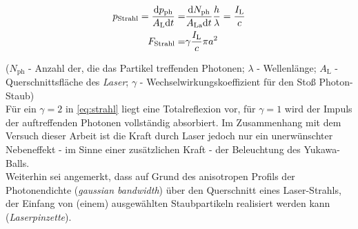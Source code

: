\documentclass[numbers=noenddot,a4paper,notitlepage,twoside,BCOR15mm]{scrbook}
\newcommand{\diff}{\textnormal{d}}
\newcommand{\ix}[1]{_\text{#1}}
\newcommand{\tilt}[1]{\textit{#1}}
\begin{document}
				\begin{align}
					p\ix{Strahl}=\frac{\diff p\ix{ph}}{A\ix{L}\diff t}=&\frac{\diff N\ix{ph}}{A\ix{La}\diff t}\frac{h}{\lambda}=\frac{I\ix{L}}{c} \nonumber \\
					F\ix{Strahl}=&\gamma\frac{I\ix{L}}{c}\pi a^2 \label{eq:strahl}
				\end{align}

			($N\ix{ph}$ - Anzahl der, die das Partikel treffenden Photonen; $\lambda$ - Wellenlänge; $A\ix{L}$ - Querschnittsfläche des \tilt{Laser}; $\gamma$ - Wechselwirkungskoeffizient für den Stoß Photon-Staub)\\
			Für ein $\gamma=2$ in \autoref{eq:strahl} liegt eine Totalreflexion vor, für $\gamma=1$ wird der Impuls der auftreffenden Photonen vollständig absorbiert. Im Zusammenhang mit dem Versuch dieser Arbeit ist die Kraft durch Laser jedoch nur ein unerwünschter Nebeneffekt - im Sinne einer zusätzlichen Kraft - der Beleuchtung des Yukawa-Balls.\\
			Weiterhin sei angemerkt, dass auf Grund des anisotropen Profils der Photonendichte (\tilt{gaussian bandwidth}) über den Querschnitt eines Laser-Strahls, der Einfang von (einem) ausgewählten Staubpartikeln realisiert werden kann (\tilt{Laserpinzette}).

\end{document}

